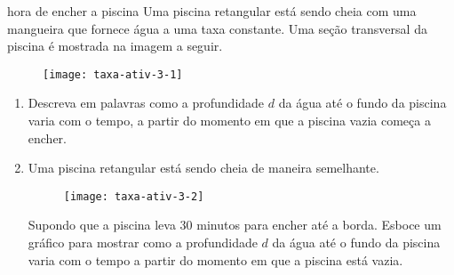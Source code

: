 \begin{task}{hora de encher a piscina}
Uma piscina retangular está sendo cheia com uma mangueira que fornece água a uma taxa constante. Uma seção transversal da piscina é mostrada na imagem a seguir.

\begin{figure}[H]
\centering
\texttt{[image: taxa-ativ-3-1]}
\end{figure}

\begin{enumerate}
\item Descreva em palavras como a profundidade $d$ da água até o fundo da piscina varia com o tempo, a partir do momento em que a piscina vazia começa a encher.
\item Uma piscina retangular está sendo cheia de maneira semelhante.

\begin{figure}[H]
\centering
\texttt{[image: taxa-ativ-3-2]}

\end{figure}

Supondo que a piscina leva 30 minutos para encher até a borda. Esboce um gráfico para mostrar como a profundidade $d$ da água até o fundo da piscina varia com o tempo a partir do momento em que a piscina está vazia.

\begin{figure}[H]
\centering

\end{figure}
\end{enumerate}
\end{task}

